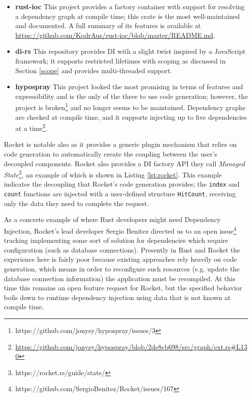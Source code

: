 \documentclass[sigconf]{acmart}
\begin{document}
\begin{itemize}
\item \textbf{rust-ioc} This project provides a factory container with support for resolving a dependency graph at compile time; this crate is the most well-maintained and documented. A full summary of its features is available at \url{https://github.com/KodrAus/rust-ioc/blob/master/README.md}.
\item \textbf{di-rs} This repository provides DI with a slight twist inspired by a JavaScript framework\cite{inceptor}; it supports restricted lifetimes with scoping as discussed in Section \ref{scope} and provides multi-threaded support.
\item \textbf{hypospray} This project looked the most promising in terms of features and expressibility and is the only of the three to use code generation; however, the project is broken\footnote{https://github.com/jonysy/hypospray/issues/3} and no longer seems to be maintained. Dependency graphs are checked at compile time, and it supports injecting up to five dependencies at a time\footnote{\url{https://github.com/jonysy/hypospray/blob/2de8cb698/src/graph/ext.rs\#L130}}.
\end{itemize}

Rocket is notable also as it provides a generic plugin mechanism that relies on code generation to automatically create the coupling between the user's decoupled components. Rocket also provides a DI factory API they call \textit{Managed State}\footnote{https://rocket.rs/guide/state/}, an example of which is shown in Listing \ref{lst:rocket}. This example indicates the decoupling that Rocket's code generation provides; the \lstinline{index} and \lstinline{count} functions are injected with a user-defined structure \lstinline{HitCount}, receiving only the data they need to complete the request.

\begin{minipage}{\linewidth}

\end{minipage}

As a concrete example of where Rust developers might need Dependency Injection, Rocket's lead developer Sergio Benitez directed us to an open issue\footnote{https://github.com/SergioBenitez/Rocket/issues/167} tracking implementing some sort of solution for dependencies which require configuration (such as database connections). Presently in Rust and Rocket the experience here is fairly poor because existing approaches rely heavily on code generation, which means in order to reconfigure such resources (e.g. update the database connection information) the application must be recompiled. At this time this remains an open feature request for Rocket, but the specified behavior boils down to runtime dependency injection using data that is not known at compile time.
\end{document}
